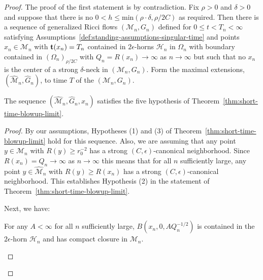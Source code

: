 \begin{proof}
The proof of the first statement is by contradiction. Fix $\rho>0$
and $\delta>0$ and suppose that there is no $0<h\le \mathrm{min}(\rho\cdot\delta,\rho/2C)$ as required. Then there is a sequence
of generalized Ricci flows $({\mathcal M}_n,G_n)$ defined for $0\le
t<T_n<\infty$ satisfying Assumptions~\ref{def:standing-assumptions-singular-time} and points
$x_n\in {\mathcal M}_n$ with ${\bf t}(x_n)=T_n$ contained in
$2\epsilon$-horns ${\mathcal H}_n$ in $\Omega_n$ with boundary
contained in $(\Omega_n)_{\rho/2C}$ with $Q_n=R(x_n)\rightarrow
\infty$ as $n\rightarrow \infty$ but such that no $x_n$ is the
center of a strong $\delta$-neck in $({\mathcal M}_n, G_n)$. Form
the maximal extensions, $(\widehat{\mathcal M}_n,\widehat G_n)$, to
time $T$ of the $({\mathcal M}_n,G_n)$.

\begin{claim}
\label{claim:rescaled-sequence-satisfies-hypotheses}
\label{hyp}
The sequence $(\widehat{\mathcal M}_n,\widehat G_n,x_n)$ satisfies
the five hypothesis of Theorem~\ref{thm:short-time-blowup-limit}.
\end{claim}

\begin{proof}
By our assumptions, Hypotheses (1) and (3) of
Theorem~\ref{thm:short-time-blowup-limit} hold for this sequence.
 Also, we are assuming that any point $y\in {\mathcal M}_n$ with
 $R(y)\ge r_0^{-2}$ has a strong $(C,\epsilon)$-canonical neighborhood. Since
$R(x_n)=Q_n\rightarrow \infty$ as $n\rightarrow\infty$ this means
that for all $n$ sufficiently large, any point $y\in \widehat
{\mathcal M}_n$ with $R(y)\ge R(x_n)$ has a strong
$(C,\epsilon)$-canonical neighborhood. This establishes Hypothesis
(2) in the statement of Theorem~\ref{thm:short-time-blowup-limit}.

Next, we have:

\begin{claim}
\label{claim:ball-contained-in-horn-compact-closure}
For any $A<\infty$ for all $n$ sufficiently large,
$B(x_n,0,AQ_n^{-1/2})$ is contained in the $2\epsilon$-horn
${\mathcal H}_n$ and has compact closure in ${\mathcal M}_n$.
\end{claim}


\end{proof}
\end{proof}
